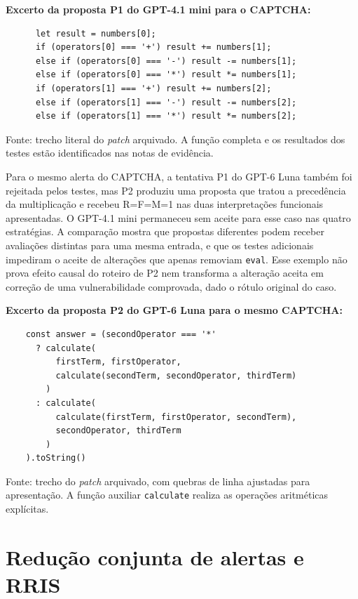\textbf{Excerto da proposta P1 do GPT-4.1 mini para o CAPTCHA:}

{\footnotesize
\begin{verbatim}
      let result = numbers[0];
      if (operators[0] === '+') result += numbers[1];
      else if (operators[0] === '-') result -= numbers[1];
      else if (operators[0] === '*') result *= numbers[1];
      if (operators[1] === '+') result += numbers[2];
      else if (operators[1] === '-') result -= numbers[2];
      else if (operators[1] === '*') result *= numbers[2];
\end{verbatim}
}

{\footnotesize Fonte: trecho literal do \textit{patch} arquivado. A função completa e os resultados dos testes estão identificados nas notas de evidência.\par}

Para o mesmo alerta do CAPTCHA, a tentativa P1 do GPT-6 Luna também foi rejeitada pelos testes, mas P2 produziu uma proposta que tratou a precedência da multiplicação e recebeu R=F=M=1 nas duas interpretações funcionais apresentadas. O GPT-4.1 mini permaneceu sem aceite para esse caso nas quatro estratégias. A comparação mostra que propostas diferentes podem receber avaliações distintas para uma mesma entrada, e que os testes adicionais impediram o aceite de alterações que apenas removiam \texttt{eval}. Esse exemplo não prova efeito causal do roteiro de P2 nem transforma a alteração aceita em correção de uma vulnerabilidade comprovada, dado o rótulo original do caso.

\textbf{Excerto da proposta P2 do GPT-6 Luna para o mesmo CAPTCHA:}

{\scriptsize
\begin{verbatim}
    const answer = (secondOperator === '*'
      ? calculate(
          firstTerm, firstOperator,
          calculate(secondTerm, secondOperator, thirdTerm)
        )
      : calculate(
          calculate(firstTerm, firstOperator, secondTerm),
          secondOperator, thirdTerm
        )
    ).toString()
\end{verbatim}
}

{\footnotesize Fonte: trecho do \textit{patch} arquivado, com quebras de linha ajustadas para apresentação. A função auxiliar \texttt{calculate} realiza as operações aritméticas explícitas.\par}

\section{Redução conjunta de alertas e RRIS}
\label{sec:res-rris}


